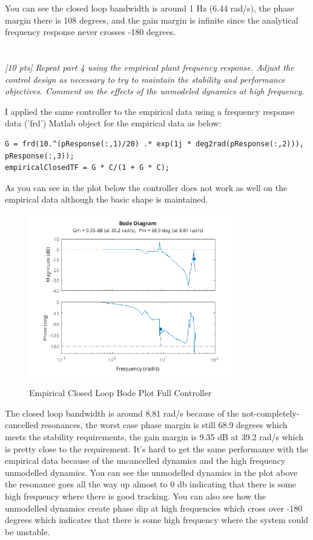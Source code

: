 \documentclass{article}
\begin{document}
You can see the closed loop bandwidth is around 1 Hz (6.44 rad/s), the phase margin there is 108 degrees, and the gain margin is infinite since the analytical frequency response never crosses -180 degrees.

\section{}

\textit{[10 pts] Repeat part 4 using the empirical plant frequency response. Adjust the control design as necessary to try to maintain the stability and performance objectives. Comment on the effects of the unmodeled dynamics at high frequency.}

I applied the same controller to the empirical data using a frequency response data ('frd') Matlab object for the empirical data as below:

\begin{lstlisting}[style=matlabstyle]
G = frd(10.^(pResponse(:,1)/20) .* exp(1j * deg2rad(pResponse(:,2))), pResponse(:,3));
empiricalClosedTF = G * C/(1 + G * C);
\end{lstlisting}

As you can see in the plot below the controller does not work as well on the empirical data although the basic shape is maintained.

\begin{figure}[H]
    \centering
    \includegraphics[width=0.8\textwidth]{feedbackEmpiricalSame.png}
    \label{fig:feedbackEmpiricalSame}
    \caption{Empirical Closed Loop Bode Plot Full Controller}
\end{figure}

The closed loop bandwidth is around 8.81 rad/s because of the not-completely-cancelled resonances, the worst case phase margin is still 68.9 degrees which meets the stability requirements, the gain margin is 9.35 dB at 39.2 rad/s which is pretty close to the requirement.
It's hard to get the same performance with the empirical data because of the uncancelled dynamics and the high frequency unmodelled dynamics.
You can see the unmodelled dynamics in the plot above the resonance goes all the way up almost to 0 db indicating that there is some high frequency where there is good tracking.
You can also see how the unmodelled dynamics create phase dip at high frequencies which cross over -180 degrees which indicates that there is some high frequency where the system could be unstable.
\end{document}
